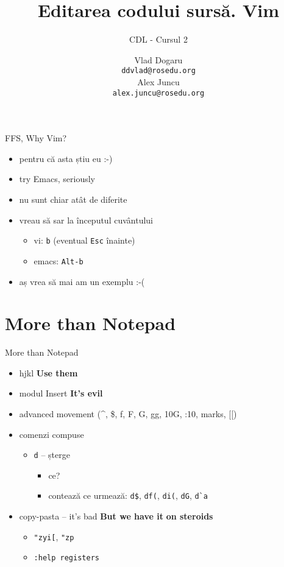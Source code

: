 \documentclass{beamer}
\title[]{Editarea codului surs\u{a}. Vim}
\subtitle{CDL - Cursul 2}
\institute[]{ROSEdu}
\author[]{Vlad Dogaru \\ \texttt{ddvlad@rosedu.org} \\ Alex Juncu \\
\texttt{alex.juncu@rosedu.org}}
\begin{document}
\maketitle

\tableofcontents

\begin{frame}{FFS, Why Vim?}
  \begin{itemize}
    \item pentru că asta știu eu :-)
    \pause
    \item try Emacs, seriously
    \pause
    \item nu sunt chiar atât de diferite
    \pause
    \item vreau să sar la începutul cuvântului
    \begin{itemize}
      \item vi: \texttt{b} (eventual \texttt{Esc} înainte)
      \item emacs: \texttt{Alt-b}
    \end{itemize}
    \pause
    \item aș vrea să mai am un exemplu :-(
  \end{itemize}
\end{frame}

\section{More than Notepad}
\begin{frame}{More than Notepad}
  \begin{itemize}
    \item hjkl \pause \hspace{1cm} \textbf{Use them}
    \pause
    \item modul Insert \pause \hspace{1cm} \textbf{It's evil}
    \pause
    \item advanced movement (\^{}, \$, f, F, G, gg, 10G, :10, marks, [[)
    \pause
    \item comenzi compuse
    \pause
    \begin{itemize}
      \item \texttt{d} -- șterge
      \begin{itemize}
        \item ce?
        \pause
        \item contează ce urmează: \texttt{d\$}, \texttt{df(}, \texttt{di(},
          \texttt{dG}, \texttt{d\`{}a}
      \end{itemize}
    \end{itemize}
    \pause
    \item copy-pasta -- it's bad \pause \hspace{1cm} \textbf{But we have it}
    \pause \textbf{on steroids}
    \begin{itemize}
      \pause
      \item \texttt{"zyi[}, \texttt{"zp}
      \item \texttt{:help registers}
    \end{itemize}
  \end{itemize}
\end{frame}
\end{document}
